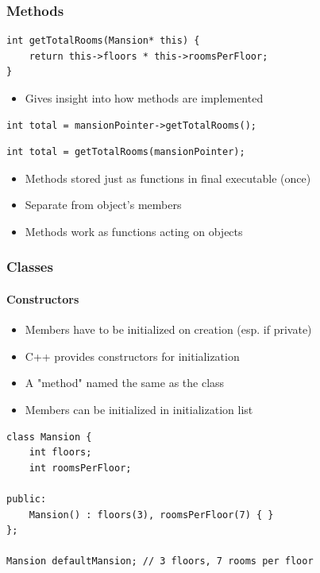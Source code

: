 \documentclass[table]{beamer}
\newcommand{\declarelesson}{\textbf{\color{themegreen}{Lesson:}} }
\newcommand{\declarebts}{\textbf{\color{themeorange}{Behind the Scenes:}} }
\begin{document}
\begin{frame}[fragile]
    \frametitle{\declarebts Methods }
    \begin{lstlisting}[title=\texttt{this} pointer idiom in C]
int getTotalRooms(Mansion* this) {
    return this->floors * this->roomsPerFloor;
}
    \end{lstlisting}
    \begin{itemize}
        \item Gives insight into how methods are implemented
    \end{itemize}
    \begin{lstlisting}[title=Calling an object's method]
int total = mansionPointer->getTotalRooms();
    \end{lstlisting}
    \begin{lstlisting}[title=Behind the scenes]
int total = getTotalRooms(mansionPointer);
    \end{lstlisting}
    \begin{itemize}
        \item Methods stored just as functions in final executable (once)
        \item Separate from object's members
        \item Methods work as functions acting on objects
    \end{itemize}
\end{frame}





\begin{frame}[fragile]
    \frametitle{\declarelesson Classes }
    \framesubtitle{Constructors}
    \begin{itemize}
        \item Members have to be initialized on creation (esp. if private)
        \item C++ provides constructors for initialization
        \item A "method" named the same as the class
        \item Members can be initialized in initialization list
    \end{itemize}
    \begin{lstlisting}[title=Default Constructor]
class Mansion {
    int floors;
    int roomsPerFloor;

public:
    Mansion() : floors(3), roomsPerFloor(7) { }
};

Mansion defaultMansion; // 3 floors, 7 rooms per floor
    \end{lstlisting}
\end{frame}
\end{document}
